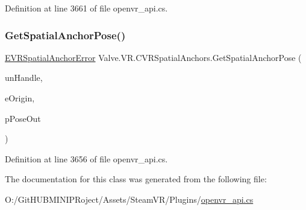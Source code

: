 Definition at line 3661 of file openvr\+\_\+api.\+cs.

\mbox{\label{class_valve_1_1_v_r_1_1_c_v_r_spatial_anchors_af537aeab54825d30f8b7b377edce25bf}} 
\subsubsection{\texorpdfstring{GetSpatialAnchorPose()}{GetSpatialAnchorPose()}}
{\footnotesize\ttfamily \mbox{\hyperlink{namespace_valve_1_1_v_r_ab0aeb9b02c0851286deb0b4134b220d4}{E\+V\+R\+Spatial\+Anchor\+Error}} Valve.\+V\+R.\+C\+V\+R\+Spatial\+Anchors.\+Get\+Spatial\+Anchor\+Pose (\begin{DoxyParamCaption}\item[{uint}]{un\+Handle,  }\item[{\mbox{\hyperlink{namespace_valve_1_1_v_r_a29be99a3c2f780157bd490db06a7f12f}{E\+Tracking\+Universe\+Origin}}}]{e\+Origin,  }\item[{ref \mbox{\hyperlink{struct_valve_1_1_v_r_1_1_spatial_anchor_pose__t}{Spatial\+Anchor\+Pose\+\_\+t}}}]{p\+Pose\+Out }\end{DoxyParamCaption})}



Definition at line 3656 of file openvr\+\_\+api.\+cs.



The documentation for this class was generated from the following file\+:\begin{DoxyCompactItemize}
\item 
O\+:/\+Git\+H\+U\+B\+M\+I\+N\+I\+P\+Roject/\+Assets/\+Steam\+V\+R/\+Plugins/\mbox{\hyperlink{openvr__api_8cs}{openvr\+\_\+api.\+cs}}\end{DoxyCompactItemize}
